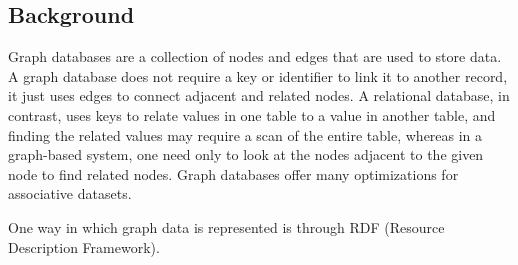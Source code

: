 \subsection*{Background}


Graph databases are a collection of nodes and edges that are used to store data. A graph database does not require a key or identifier to link it to another record, it just uses edges to connect adjacent and related nodes. A relational database, in contrast, uses keys to relate values in one table to a value in another table, and finding the related values may require a scan of the entire table, whereas in a graph-based system, one need only to look at the nodes adjacent to the given node to find related nodes. Graph databases offer many optimizations for associative datasets.





One way in which graph data is represented is through RDF (Resource Description Framework). 


